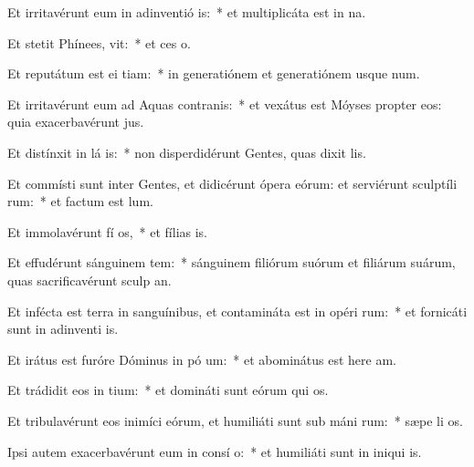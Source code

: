 \item Et irritavérunt eum in adinventió is:~* et multiplicáta est in  na.
\item Et stetit Phínees,  vit:~* et ces o.
\item Et reputátum est ei  tiam:~* in generatiónem et generatiónem usque  num.
\item Et irritavérunt eum ad Aquas contranis:~* et vexátus est Móyses propter eos: quia exacerbavérunt  jus.
\item Et distínxit in lá is:~* non disperdidérunt Gentes, quas dixit  lis.
\item Et commísti sunt inter Gentes, et didicérunt ópera eórum: et serviérunt sculptíli rum:~* et factum est   lum.
\item Et immolavérunt fí os,~* et fílias  is.
\item Et effudérunt sánguinem tem:~* sánguinem filiórum suórum et filiárum suárum, quas sacrificavérunt sculp an.
\item Et infécta est terra in sanguínibus, et contamináta est in opéri rum:~* et fornicáti sunt in adinventi is.
\item Et irátus est furóre Dóminus in pó um:~* et abominátus est here am.
\item Et trádidit eos in  tium:~* et domináti sunt eórum qui  os.
\item Et tribulavérunt eos inimíci eórum, et humiliáti sunt sub máni rum:~* sæpe li os.
\item Ipsi autem exacerbavérunt eum in consí o:~* et humiliáti sunt in iniqui is.
